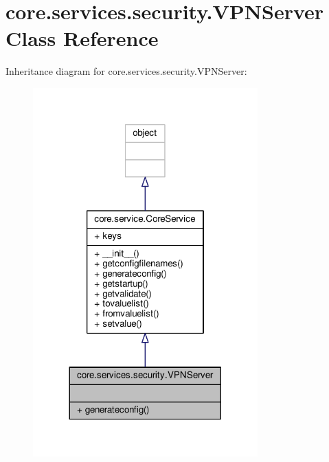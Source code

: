 \hypertarget{classcore_1_1services_1_1security_1_1_v_p_n_server}{\section{core.\+services.\+security.\+V\+P\+N\+Server Class Reference}
\label{classcore_1_1services_1_1security_1_1_v_p_n_server}
}


Inheritance diagram for core.\+services.\+security.\+V\+P\+N\+Server\+:
\nopagebreak
\begin{figure}[H]
\begin{center}
\leavevmode
\includegraphics[width=245pt]{classcore_1_1services_1_1security_1_1_v_p_n_server__inherit__graph}
\end{center}
\end{figure}


